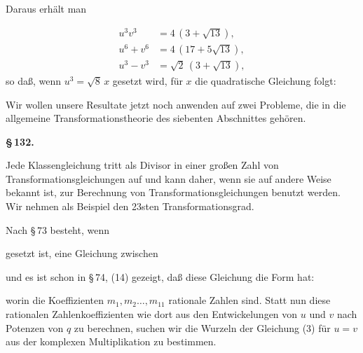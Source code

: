 
Daraus erhält man

\[
\begin{aligned}
u^3v^3 &= 4\,(3+\sqrt{13}), \\
u^6+v^6 &= 4\,(17+5\sqrt{13}), \\
u^3-v^3 &= \sqrt{2}\,(3+\sqrt{13}),
\end{aligned}
\]
so daß, wenn $u^3 = \sqrt{8}\,x$ gesetzt wird, für $x$ die quadratische Gleichung folgt:


Wir wollen unsere Resultate jetzt noch anwenden auf zwei Probleme, die in die allgemeine Transformationstheorie des siebenten Abschnittes gehören.

\begin{center}
\textbf{\S\,132. }
\end{center}

Jede Klassengleichung tritt als Divisor in einer großen Zahl von Transformationsgleichungen auf und kann daher, wenn sie auf andere Weise bekannt ist, zur Berechnung von Transformationsgleichungen benutzt werden. Wir nehmen als Beispiel den 23sten Transformationsgrad.

Nach \S\,73 besteht, wenn


gesetzt ist, eine Gleichung zwischen


und es ist schon in \S\,74, (14) gezeigt, daß diese Gleichung die Form hat:


worin die Koeffizienten $m_1, m_2 \ldots, m_{11}$ rationale Zahlen sind. Statt nun diese rationalen Zahlenkoeffizienten wie dort aus den Entwickelungen von $u$ und $v$ nach Potenzen von $q$ zu berechnen, suchen wir die Wurzeln der Gleichung (3) für $u=v$ aus der komplexen Multiplikation zu bestimmen.
